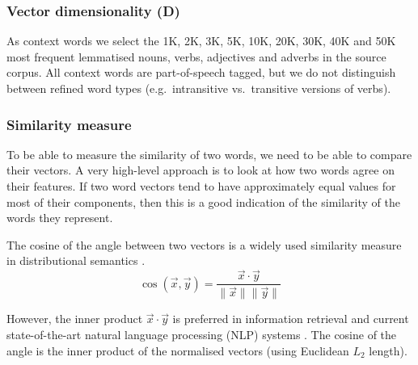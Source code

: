 
\subsubsection{Vector dimensionality (D)}
\label{sec:vect-dimens}

As context words we select the 1K, 2K, 3K, 5K, 10K, 20K, 30K, 40K and 50K most frequent lemmatised nouns, verbs, adjectives and adverbs in the source corpus. All context words are part-of-speech tagged, but we do not distinguish between refined word types (e.g.~intransitive vs.~transitive versions of verbs).

\subsubsection{Similarity measure}
\label{sec:similarity-measure}

To be able to measure the similarity of two words, we need to be able to compare their vectors.\footnotemark{} A very high-level approach is to look at how two words agree on their features. If two word vectors tend to have approximately equal values for most of their components, then this is a good indication of the similarity of the words they represent.


The cosine of the angle between two vectors is a widely used similarity measure in distributional semantics \cite{Turney:2010:FMV:1861751.1861756,lapesa2014large}.
%
\begin{equation*}
  \label{eq:cos}
  \cos(\vec{x}, \vec{y}) = \frac{\vec{x} \cdot \vec{y}}
                                {\|\vec{x}\| \|\vec{y}\|}
\end{equation*}

However, the inner product $\vec{x} \cdot \vec{y}$ is preferred in information retrieval and current state-of-the-art natural language processing (NLP) systems \cite{mikolov2013distributed,mikolov2013linguistic,TACL570}. The cosine of the angle is the inner product of the normalised vectors (using Euclidean $L_2$ length).
%
%

